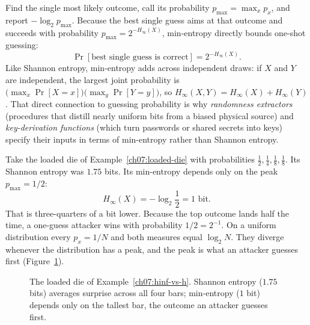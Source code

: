 Find the single most likely outcome, call its probability $p_{\max} = \max_x p_x$, and report $-\log_2 p_{\max}$. Because the best single guess aims at that outcome and succeeds with probability $p_{\max} = 2^{-H_\infty(X)}$, min-entropy directly bounds one-shot guessing:
\[
  \Pr[\text{best single guess is correct}] = 2^{-H_\infty(X)}.
\]
Like Shannon entropy, min-entropy adds across independent draws: if $X$ and $Y$ are independent, the largest joint probability is $\bigl(\max_x \Pr[X=x]\bigr)\bigl(\max_y \Pr[Y=y]\bigr)$, so $H_\infty(X, Y) = H_\infty(X) + H_\infty(Y)$. That direct connection to guessing probability is why \emph{randomness extractors} (procedures that distill nearly uniform bits from a biased physical source) and \emph{key-derivation functions} (which turn passwords or shared secrets into keys) specify their inputs in terms of min-entropy rather than Shannon entropy.

\begin{example}
\label{ch07:hinf-vs-h}
Take the loaded die of Example~\ref{ch07:loaded-die} with probabilities $\frac{1}{2}, \frac{1}{4}, \frac{1}{8}, \frac{1}{8}$. Its Shannon entropy was $1.75$ bits. Its min-entropy depends only on the peak $p_{\max} = 1/2$:
\[
  H_\infty(X) = -\log_2 \frac{1}{2} = 1\text{ bit}.
\]
That is three-quarters of a bit lower. Because the top outcome lands half the time, a one-guess attacker wins with probability $1/2 = 2^{-1}$. On a uniform distribution every $p_x = 1/N$ and both measures equal $\log_2 N$. They diverge whenever the distribution has a peak, and the peak is what an attacker guesses first (Figure~\ref{ch07:loaded-die-bars}).
\end{example}

\begin{figure}[htbp]
\centering
{}
\caption{The loaded die of Example~\ref{ch07:hinf-vs-h}. Shannon entropy ($1.75$ bits) averages surprise across all four bars; min-entropy ($1$ bit) depends only on the tallest bar, the outcome an attacker guesses first.}
\label{ch07:loaded-die-bars}
\end{figure}

